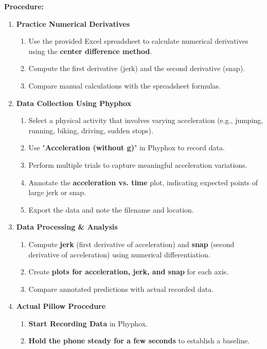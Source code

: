 \documentclass[idxtotoc,hyperref,openany]{labbook} %
\begin{document}
\hfill \break
\textbf{Procedure:}
\begin{enumerate}
    \item \textbf{Practice Numerical Derivatives}
    \begin{enumerate}[$\bullet$]
        \item Use the provided Excel spreadsheet to calculate numerical derivatives using the \textbf{center difference method}.
        \item Compute the first derivative (jerk) and the second derivative (snap).
        \item Compare manual calculations with the spreadsheet formulas.
    \end{enumerate}
    \item \textbf{Data Collection Using Phyphox}
    \begin{enumerate}[$\bullet$]
        \item Select a physical activity that involves varying acceleration (e.g., jumping, running, biking, driving, sudden stops).
        \item Use "\textbf{Acceleration (without g)}" in Phyphox to record data.
        \item Perform multiple trials to capture meaningful acceleration variations.
        \item Annotate the \textbf{acceleration vs. time} plot, indicating expected points of large jerk or snap.
        \item Export the data and note the filename and location.
    \end{enumerate}
    \item \textbf{Data Processing \& Analysis}
    \begin{enumerate}[$\bullet$]
        \item Compute \textbf{jerk} (first derivative of acceleration) and \textbf{snap} (second derivative of acceleration) using numerical differentiation.
        \item Create \textbf{plots for acceleration, jerk, and snap} for each axis.
        \item Compare annotated predictions with actual recorded data.
    \end{enumerate}
    \item \textbf{Actual Pillow Procedure}
    \begin{enumerate}[$\bullet$]
        \item \textbf{Start Recording Data} in Phyphox.
        \item \textbf{Hold the phone steady for a few seconds} to establish a baseline.

\end{enumerate}
\end{enumerate}
\end{document}
